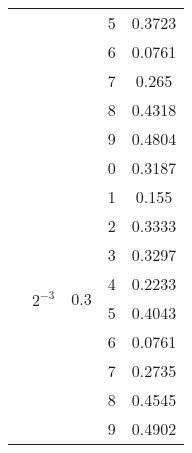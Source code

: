 \documentclass[a4paper,12pt]{article}
\begin{document}
\begin{table}[h]
\begin{tabular}{ |c|c|c|c|c| }
                      &                                         &                         & 5 & 0.3723 \\ \cline{4-5} 
                      &                                         &                         & 6 & 0.0761 \\ \cline{4-5} 
                      &                                         &                         & 7 & 0.265  \\ \cline{4-5} 
                      &                                         &                         & 8 & 0.4318 \\ \cline{4-5} 
                      &                                         &                         & 9 & 0.4804 \\ \cline{2-5}
                      & \multirow{10}{*}{$2^{-3}$}              & \multirow{10}{*}{0.3}   & 0 & 0.3187 \\ \cline{4-5} 
                      &                                         &                         & 1 & 0.155  \\ \cline{4-5} 
                      &                                         &                         & 2 & 0.3333 \\ \cline{4-5} 
                      &                                         &                         & 3 & 0.3297 \\ \cline{4-5} 
                      &                                         &                         & 4 & 0.2233 \\ \cline{4-5} 
                      &                                         &                         & 5 & 0.4043 \\ \cline{4-5} 
                      &                                         &                         & 6 & 0.0761 \\ \cline{4-5} 
                      &                                         &                         & 7 & 0.2735 \\ \cline{4-5} 
                      &                                         &                         & 8 & 0.4545 \\ \cline{4-5} 
                      &                                         &                         & 9 & 0.4902 \\ \hline

                     
\end{tabular}
\end{table}
\end{document}

